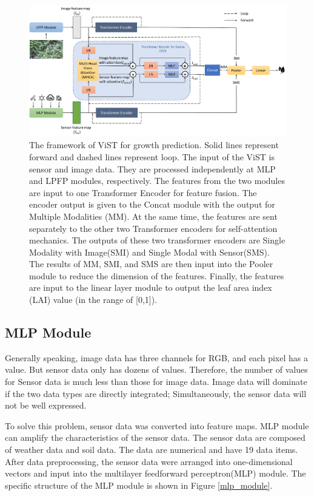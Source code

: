 \documentclass[acmsmall, screen]{acmart}
\begin{document}
\begin{figure}[htbp]
  \centering
  \includegraphics[width=\linewidth]{pic/model_structure.png}
  \caption{The framework of ViST for growth prediction. Solid lines represent forward and dashed lines represent loop. The input of the ViST is sensor and image data. They are processed independently at MLP and LPFP modules, respectively. The features from the two modules are input to one Transformer Encoder for feature fusion. The encoder output is given to the Concat module with the output for Multiple Modalities (MM). At the same time, the features are sent separately to the other two Transformer encoders for self-attention mechanics. The outputs of these two transformer encoders are Single Modality with Image(SMI) and Single Modal with Sensor(SMS). The results of MM, SMI, and SMS are then input into the Pooler module to reduce the dimension of the features. Finally, the features are input to the linear layer module to output the leaf area index (LAI) value (in the range of [0,1]).}
  \label{model_structure}
\end{figure}



\subsection{MLP Module}
Generally speaking, image data has three channels for RGB, and each pixel has a value. But sensor data only has dozens of values. Therefore, the number of values for Sensor data is much less than those for image data. Image data will dominate if the two data types are directly integrated; Simultaneously, the sensor data will not be well expressed.

To solve this problem, sensor data was converted into feature maps. MLP module can amplify the characteristics of the sensor data. The sensor data are composed of weather data and soil data. The data are numerical and have 19 data items. After data preprocessing, the sensor data were arranged into one-dimensional vectors and input into the multilayer feedforward perceptron(MLP) module. The specific structure of the MLP module is shown in Figure \ref{mlp_module}.
\end{document}
